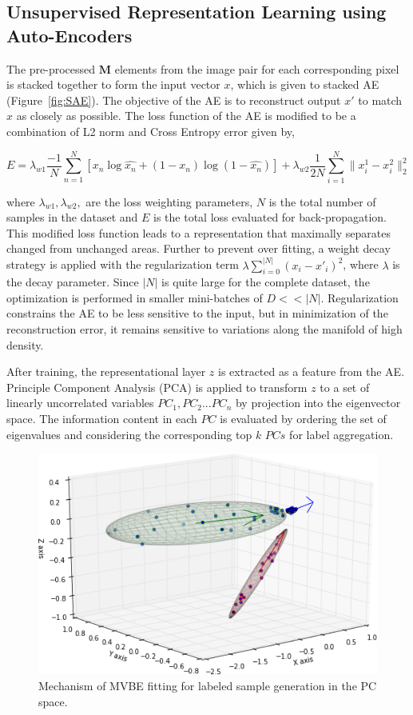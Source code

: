 \subsection{Unsupervised Representation Learning using Auto-Encoders}
\label{sub:ae}

The pre-processed $\mathbf{M}$ elements from the image pair for each corresponding pixel is stacked together  to form the input vector $x$, which is given to stacked AE (Figure~\ref{fig:SAE}). The objective of the AE is to reconstruct output $x'$ to match $x$ as closely as possible. The loss function of the AE is modified to be a combination of L2 norm and Cross Entropy error given by,

\begin{dmath} 
E = \lambda_{w1} \frac{-1}{N}\sum_{n=1}^{N}[x_n \log \hat{x_n} + (1 - x_n)\log(1-\hat{x_n})] 
     + \lambda_{w2} \frac 1 {2N} \sum_{i=1}^N \| x^1_i - x^2_i \|_2^2
\end{dmath}

where $\lambda_{w1},\lambda_{w2},$ are the loss weighting parameters, $N$ is the total number of samples in the dataset and $E$ is the total loss evaluated for back-propagation. This modified loss function leads to a representation that maximally separates changed from unchanged areas. Further to prevent over fitting, a weight decay strategy is applied with the regularization term $\lambda \sum_{i=0}^{|N|} (x_i-x'_i)^2$, where $\lambda$ is the decay parameter. Since $|N|$ is quite large for the complete dataset, the optimization is performed in smaller mini-batches of $D << |N|$. Regularization constrains the AE to be less sensitive to the input, but in minimization of the reconstruction error, it remains sensitive to variations along the manifold of high density. %

After  training, the representational layer $z$ is extracted as a feature from the AE. Principle Component Analysis (PCA) is applied to transform $z$  to a set of linearly uncorrelated variables $PC_1, PC_2... PC_n$ by projection into the eigenvector space. The information content in each $PC$ is evaluated by ordering the set of eigenvalues and considering the corresponding top $k$ $PCs$ for label aggregation. 

\begin{figure}[tbhp]
\centering
\includegraphics[width=0.6\columnwidth]{Figures/CD/3d}
\caption{Mechanism of MVBE fitting for labeled sample generation in the PC space.}
\label{fig:MVE}
\end{figure}


